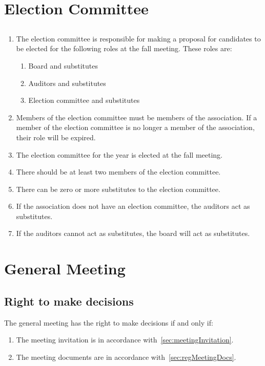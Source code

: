 \section*{Election Committee}
\subsection{}
\begin{enumerate}
  \item The election committee is responsible for making a proposal for candidates to be elected for the following roles at the fall meeting. These roles are:
  \begin{enumerate}
    \item Board and substitutes
    \item Auditors and substitutes
    \item Election committee and substitutes
  \end{enumerate}
  \item Members of the election committee must be members of the association. If a member of the election committee is no longer a member of the association, their role will be expired.
  \item The election committee for the year is elected at the fall meeting.
  \item There should be at least two members of the election committee. 
  \item There can be zero or more substitutes to the election committee.
  \item If the association does not have an election committee, the auditors act as substitutes.
  \item If the auditors cannot act as substitutes, the board will act as substitutes.
\end{enumerate}

\section*{General Meeting}

\subsection{Right to make decisions}
The general meeting has the right to make decisions if and only if:
\begin{enumerate}
  \item The meeting invitation is in accordance with~\ref{sec:meetingInvitation}.
  \item The meeting documents are in accordance with~\ref{sec:regMeetingDocs}.
\end{enumerate}

